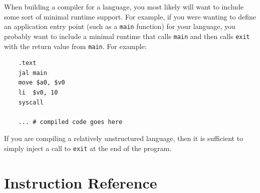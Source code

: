 \documentclass[12pt]{article}
\begin{document}
When building a compiler for a language, you most likely will want to include
     some sort of minimal runtime support. For example, if you were wanting to
     define an application entry point (such as a \texttt{main} function) for
     your language, you probably want to include a minimal runtime that calls
     \texttt{main} and then calls \texttt{exit} with the return value from
     \texttt{main}. For example:

\begin{lstlisting}
    .text
    jal main
    move $a0, $v0
    li  $v0, 10
    syscall

    ... # compiled code goes here
\end{lstlisting}

If you are compiling a relatively unstructured language, then it is sufficient
     to simply inject a call to \texttt{exit} at the end of the program.

\section{Instruction Reference}
\label{sec:iref}
\end{document}
